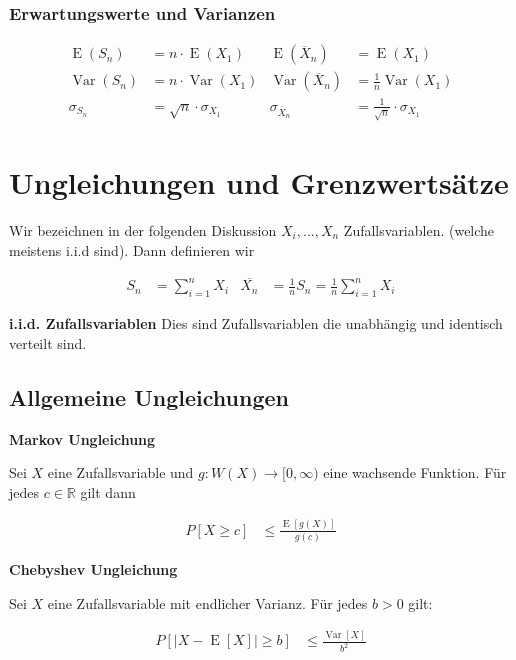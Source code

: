 \documentclass[25pt]{sciposter}
\newcommand{\R}{\mathbb{R}}
\newcommand{\Var}{\operatorname{Var}}
\newcommand{\E}{\operatorname{E}}
\newenvironment{method}[1]{\begin{mdframed}[backgroundcolor=blue!10,innertopmargin=15pt, innerbottommargin=15pt,nobreak=true]
		\textbf{#1 }
	}
	{ 
	\end{mdframed}
}
\begin{document}
\begin{multicols}{3}
		\subsubsection*{Erwartungswerte und Varianzen}
		\begin{align*}
			\E(S_n) &= n \cdot \E(X_1) & \E(\overline{X}_n) &= \E(X_1) \\
			\Var(S_n) &= n \cdot \Var(X_1) & \Var(\overline{X}_n) &= \tfrac{1}{n} \Var(X_1) \\
			\sigma_{S_n} &= \sqrt{n} \cdot \sigma_{X_1} & \sigma_{\overline{X}_n} &= \tfrac{1}{\sqrt{n}} \cdot \sigma_{X_1}
		\end{align*}
		
		
		
		\section{Ungleichungen und Grenzwertsätze}
		
		Wir bezeichnen in der folgenden Diskussion $X_i, \ldots, X_n$ Zufallsvariablen. (welche meistens i.i.d sind). Dann definieren wir
		
		\begin{align*}
			S_n &= \sum_{i=1}^{n} X_i & \overline{X_n} &= \frac{1}{n}S_n = \frac{1}{n}\sum_{i=1}^{n}X_i
		\end{align*}
		
		\textbf{i.i.d. Zufallsvariablen} Dies sind Zufallsvariablen die unabhängig und identisch verteilt sind. 
		
		\subsection*{Allgemeine Ungleichungen}
		
		\begin{method}{Markov Ungleichung}
			Sei $X$ eine Zufallsvariable und $g:W(X)\to [0,\infty)$ eine wachsende Funktion. Für jedes $c\in\R$ gilt dann 
			
			\begin{align*}
				P[X \geq c] &\leq \frac{\E[g(X)]}{g(c)}
			\end{align*}
		\end{method}
		
		
		\begin{method}{Chebyshev Ungleichung}
			Sei $X$ eine Zufallsvariable mit endlicher Varianz. Für jedes $b>0$ gilt:
			
			\begin{align*}
				P[|X-\E[X]| \geq b] &\leq \frac{\Var[X]}{b^2}
			\end{align*}
		\end{method}
		

\end{multicols}
\end{document}
